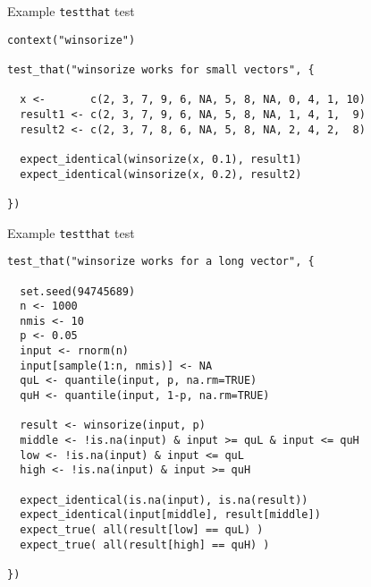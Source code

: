 \documentclass[aspectratio=169,12pt,t]{beamer}
\begin{document}
\begin{frame}[c,fragile]{Example {\tt testthat} test}


\begin{lstlisting}
context("winsorize")

test_that("winsorize works for small vectors", {

  x <-       c(2, 3, 7, 9, 6, NA, 5, 8, NA, 0, 4, 1, 10)
  result1 <- c(2, 3, 7, 9, 6, NA, 5, 8, NA, 1, 4, 1,  9)
  result2 <- c(2, 3, 7, 8, 6, NA, 5, 8, NA, 2, 4, 2,  8)

  expect_identical(winsorize(x, 0.1), result1)
  expect_identical(winsorize(x, 0.2), result2)

})
\end{lstlisting}



\end{frame}


\begin{frame}[c,fragile]{Example {\tt testthat} test}


\begin{lstlisting}
test_that("winsorize works for a long vector", {

  set.seed(94745689)
  n <- 1000
  nmis <- 10
  p <- 0.05
  input <- rnorm(n)
  input[sample(1:n, nmis)] <- NA
  quL <- quantile(input, p, na.rm=TRUE)
  quH <- quantile(input, 1-p, na.rm=TRUE)

  result <- winsorize(input, p)
  middle <- !is.na(input) & input >= quL & input <= quH
  low <- !is.na(input) & input <= quL
  high <- !is.na(input) & input >= quH

  expect_identical(is.na(input), is.na(result))
  expect_identical(input[middle], result[middle])
  expect_true( all(result[low] == quL) )
  expect_true( all(result[high] == quH) )

})
\end{lstlisting}



\end{frame}
\end{document}
